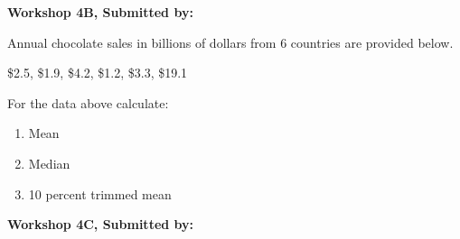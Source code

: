 \documentclass[11pt, chapterprefix=true]{scrbook}\usepackage[]{graphicx}\usepackage[]{color}
\begin{document}
\begin{exercises}
\begin{solution}
\end{solution}

\clearpage

    \begin{exercise}  %

    \begin{center}
\begin{flushleft}\textbf{\large \hfill Workshop 4B, Submitted by: }\end{flushleft}

\end{center}

Annual chocolate sales in billions of dollars from 6 countries are provided below.

\$2.5, \$1.9, \$4.2, \$1.2, \$3.3, \$19.1

For the data above calculate:

\begin{enumerate}
  \item Mean
  \item Median 
  \item 10 percent trimmed mean   %
\end{enumerate}
\end{exercise} 
\begin{solution}  %

\end{solution}

\clearpage

    \begin{exercise}  %

    \begin{center}
\begin{flushleft}\textbf{\large \hfill Workshop 4C, Submitted by: }\end{flushleft}


\end{center}
\end{exercise}
\end{exercises}
\end{document}

